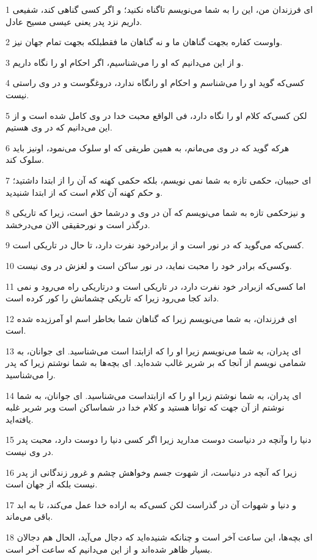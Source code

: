 \par 1 ای فرزندان من، این را به شما می‌نویسم تاگناه نکنید؛ و اگر کسی گناهی کند، شفیعی داریم نزد پدر یعنی عیسی مسیح عادل.
\par 2 واوست کفاره بجهت گناهان ما و نه گناهان ما فقطبلکه بجهت تمام جهان نیز.
\par 3 و از این می‌دانیم که او را می‌شناسیم، اگر احکام او را نگاه داریم.
\par 4 کسی‌که گوید او را می‌شناسم و احکام او رانگاه ندارد، دروغگوست و در وی راستی نیست.
\par 5 لکن کسی‌که کلام او را نگاه دارد، فی الواقع محبت خدا در وی کامل شده است و از این می‌دانیم که در وی هستیم.
\par 6 هرکه گوید که در وی می‌مانم، به همین طریقی که او سلوک می‌نمود، اونیز باید سلوک کند.
\par 7 ‌ای حبیبان، حکمی تازه به شما نمی نویسم، بلکه حکمی کهنه که آن را از ابتدا داشتید؛ و حکم کهنه آن کلام است که از ابتدا شنیدید.
\par 8 و نیزحکمی تازه به شما می‌نویسم که آن در وی و درشما حق است، زیرا که تاریکی درگذر است و نورحقیقی الان می‌درخشد.
\par 9 کسی‌که می‌گوید که در نور است و از برادرخود نفرت دارد، تا حال در تاریکی است.
\par 10 وکسی‌که برادر خود را محبت نماید، در نور ساکن است و لغزش در وی نیست.
\par 11 اما کسی‌که ازبرادر خود نفرت دارد، در تاریکی است و درتاریکی راه می‌رود و نمی داند کجا می‌رود زیرا که تاریکی چشمانش را کور کرده است.
\par 12 ‌ای فرزندان، به شما می‌نویسم زیرا که گناهان شما بخاطر اسم او آمرزیده شده است.
\par 13 ‌ای پدران، به شما می‌نویسم زیرا او را که ازابتدا است می‌شناسید. ای جوانان، به شمامی نویسم از آنجا که بر شریر غالب شده‌اید. ای بچه‌ها به شما نوشتم زیرا که پدر را می‌شناسید.
\par 14 ‌ای پدران، به شما نوشتم زیرا او را که ازابتداست می‌شناسید. ای جوانان، به شما نوشتم از آن جهت که توانا هستید و کلام خدا در شماساکن است وبر شریر غلبه یافته‌اید.
\par 15 دنیا را وآنچه در دنیاست دوست مدارید زیرا اگر کسی دنیا را دوست دارد، محبت پدر در وی نیست.
\par 16 زیرا که آنچه در دنیاست، از شهوت جسم وخواهش چشم و غرور زندگانی از پدر نیست بلکه از جهان است.
\par 17 و دنیا و شهوات آن در گذراست لکن کسی‌که به اراده خدا عمل می‌کند، تا به ابد باقی می‌ماند.
\par 18 ‌ای بچه‌ها، این ساعت آخر است و چنانکه شنیده‌اید که دجال می‌آید، الحال هم دجالان بسیار ظاهر شده‌اند و از این می‌دانیم که ساعت آخر است.
